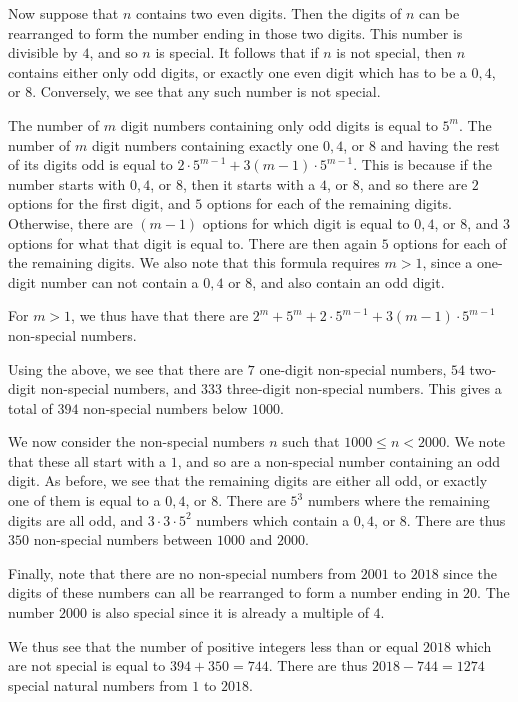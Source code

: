 \documentclass{article}
\begin{document}
\begin{enumerate}
{Now suppose that $n$ contains two even digits. Then the digits of $n$ can be rearranged to form the number ending in those two digits. This number is divisible by $4$, and so $n$ is special. It follows that if $n$ is not special, then $n$ contains either only odd digits, or exactly one even digit which has to be a $0, 4$, or $8$. Conversely, we see that any such number is not special.

The number of $m$ digit numbers containing only odd digits is equal to $5^m$. The number of $m$ digit numbers containing exactly one $0, 4$, or $8$ and having the rest of its digits odd is equal to $2 \cdot 5^{m-1} + 3(m - 1) \cdot 5^{m - 1}$. This is because if the number starts with $0, 4$, or $8$, then it starts with a $4$, or $8$, and so there are $2$ options for the first digit, and $5$ options for each of the remaining digits. Otherwise, there are $(m - 1)$ options for which digit is equal to $0, 4$, or $8$, and $3$ options for what that digit is equal to. There are then again $5$ options for each of the remaining digits. We also note that this formula requires $m > 1$, since a one-digit number can not contain a $0, 4$ or $8$, and also contain an odd digit.

For $m > 1$, we thus have that there are $2^m + 5^m + 2 \cdot 5^{m-1} + 3(m-1) \cdot 5^{m-1}$ non-special numbers.

Using the above, we see that there are $7$ one-digit non-special numbers, $54$ two-digit non-special numbers, and $333$ three-digit non-special numbers. This gives a total of $394$ non-special numbers below $1000$.

We now consider the non-special numbers $n$ such that $1000 \leq n < 2000$. We note that these all start with a $1$, and so are a non-special number containing an odd digit. As before, we see that the remaining digits are either all odd, or exactly one of them is equal to a $0, 4$, or $8$. There are $5^3$ numbers where the remaining digits are all odd, and $3 \cdot 3 \cdot 5^2$ numbers which contain a $0, 4$, or $8$. There are thus $350$ non-special numbers between $1000$ and $2000$.

Finally, note that there are no non-special numbers from $2001$ to $2018$ since the digits of these numbers can all be rearranged to form a number ending in $20$. The number $2000$ is also special since it is already a multiple of $4$.

We thus see that the number of positive integers less than or equal $2018$ which are not special is equal to $394 + 350 = 744$. There are thus $2018 - 744 = 1274$ special natural numbers from $1$ to $2018$.}


\end{enumerate}
\end{document}
